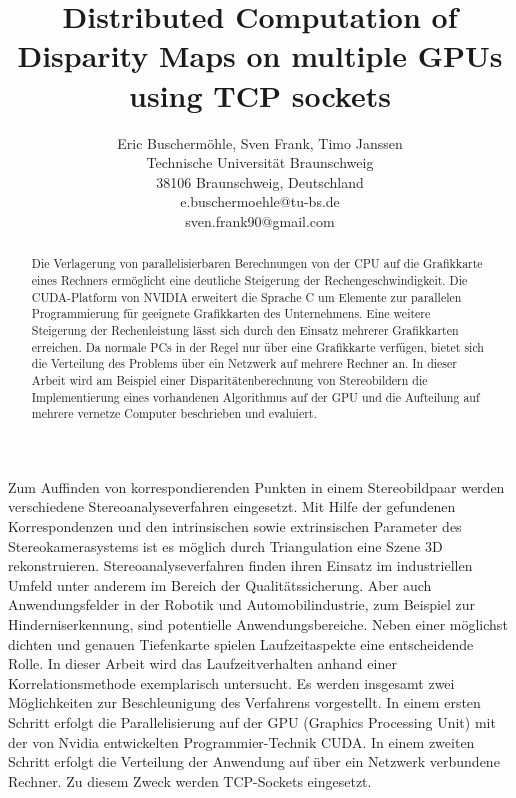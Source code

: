 \documentclass[times, 10pt,twocolumn]{article}
\begin{document}
\title{Distributed Computation of Disparity Maps on multiple GPUs using TCP sockets}

\author{Eric Buschermöhle, Sven Frank, Timo Janssen\\
Technische Universität Braunschweig \\  38106 Braunschweig, Deutschland\\
e.buschermoehle@tu-bs.de\\
sven.frank90@gmail.com\\
}


\maketitle
\thispagestyle{empty}

\begin{abstract}
   Die Verlagerung von parallelisierbaren Berechnungen von der CPU auf die Grafikkarte eines Rechners ermöglicht eine deutliche Steigerung der Rechengeschwindigkeit. Die CUDA-Platform von NVIDIA erweitert die Sprache C um Elemente zur parallelen Programmierung für geeignete Grafikkarten des Unternehmens. Eine weitere Steigerung der Rechenleistung lässt sich durch den Einsatz mehrerer Grafikkarten erreichen. Da normale PCs in der Regel nur über eine Grafikkarte verfügen, bietet sich die Verteilung des Problems über ein Netzwerk auf mehrere Rechner an. In dieser Arbeit wird am Beispiel einer Disparitätenberechnung von Stereobildern die Implementierung eines vorhandenen Algorithmus auf der GPU und die Aufteilung auf mehrere vernetze Computer beschrieben und evaluiert.
 
\end{abstract}




Zum Auffinden von korrespondierenden Punkten in einem Stereobildpaar werden verschiedene Stereoanalyseverfahren eingesetzt. Mit Hilfe der gefundenen Korrespondenzen und den intrinsischen sowie extrinsischen Parameter des Stereokamerasystems ist es möglich durch Triangulation eine Szene 3D rekonstruieren. Stereoanalyseverfahren finden ihren Einsatz im industriellen Umfeld unter anderem im Bereich der Qualitätssicherung. Aber auch Anwendungsfelder in der Robotik und Automobilindustrie, zum Beispiel zur Hinderniserkennung, sind potentielle Anwendungsbereiche. Neben einer möglichst dichten und genauen Tiefenkarte spielen Laufzeitaspekte eine entscheidende Rolle. In dieser Arbeit wird das Laufzeitverhalten anhand einer Korrelationsmethode exemplarisch untersucht. Es werden insgesamt zwei Möglichkeiten zur Beschleunigung des Verfahrens vorgestellt. In einem ersten Schritt erfolgt die Parallelisierung auf der GPU (Graphics Processing Unit) mit der von Nvidia entwickelten Programmier-Technik CUDA. In einem zweiten Schritt erfolgt die Verteilung der Anwendung auf über ein Netzwerk verbundene Rechner. Zu diesem Zweck werden TCP-Sockets eingesetzt.
\end{document}
